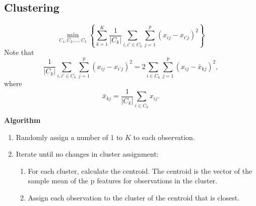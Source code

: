 \documentclass[a4paper,9pt,fleqn]{extarticle}
\begin{document}
\subsection*{Clustering}
\begin{minipage}[t]{0.45\textwidth}
    \[
    \min_{C_1, C_2, \dots, C_k} 
    \left\{
    \sum_{k=1}^{K} \frac{1}{|C_k|} 
    \sum_{i, i' \in C_k} 
    \sum_{j=1}^{p} (x_{ij} - x_{i'j})^2
    \right\}
    \]
    Note that
    \[
    \frac{1}{|C_k|}\sum_{i, i' \in C_k} \sum_{j=1}^{p} (x_{ij} - x_{i'j})^2
    = 2 \sum_{i \in C_k}\sum_{j=1}^{p} (x_{ij} - \bar{x}_{kj})^2,
    \]
    where 
    \[
    \bar{x}_{kj} = \frac{1}{|C_k|}\sum_{i \in C_k}x_{ij}.
    \]
\end{minipage}
\hfill
\begin{minipage}[t]{0.45\textwidth}
    \textbf{Algorithm}
    \begin{enumerate}
        \item Randomly assign a number of 1 to \(K\) to each observation.
        \item Iterate until no changes in cluster assignment:
        \begin{enumerate}
            \item For each cluster, calculate the centroid. The centroid is the vector of the sample mean of the p features for observations in the cluster.
            \item Assign each observation to the cluster of the centroid that is closest. 
        \end{enumerate}
    \end{enumerate}
\end{minipage}
\end{document}
